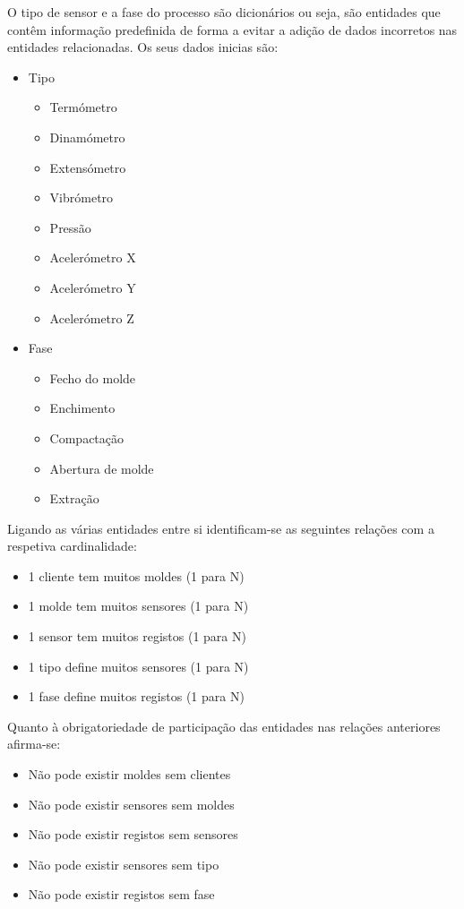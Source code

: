 \documentclass[11pt,twoside,a4paper]{report}
\begin{document}
O tipo de sensor e a fase do processo são dicionários ou seja, são entidades que contêm informação predefinida de forma a evitar a adição de dados incorretos nas entidades relacionadas. Os seus dados inicias são:
\begin{itemize}[noitemsep]
	\item Tipo
	\begin{itemize}[noitemsep]
		\item Termómetro
		\item Dinamómetro
		\item Extensómetro
		\item Vibrómetro
		\item Pressão
		\item Acelerómetro X
		\item Acelerómetro Y
		\item Acelerómetro Z
	\end{itemize}
	\newpage
	\item Fase
	\begin{itemize}[noitemsep]
		\item Fecho do molde
		\item Enchimento
		\item Compactação
		\item Abertura de molde
		\item Extração
	\end{itemize}
\end{itemize}
Ligando as várias entidades entre si identificam-se as seguintes relações com a respetiva cardinalidade:
\begin{itemize}[noitemsep]
	\item 1 cliente tem muitos moldes (1 para N)
	\item 1 molde tem muitos sensores (1 para N)
	\item 1 sensor tem muitos registos (1 para N)
	\item 1 tipo define muitos sensores (1 para N)
	\item 1 fase define muitos registos (1 para N)
\end{itemize}
Quanto à obrigatoriedade de participação das entidades nas relações anteriores afirma-se:
\begin{itemize}[noitemsep]
	\item Não pode existir moldes sem clientes
	\item Não pode existir sensores sem moldes
	\item Não pode existir registos sem sensores
	\item Não pode existir sensores sem tipo
	\item Não pode existir registos sem fase	
\end{itemize}
\end{document}
